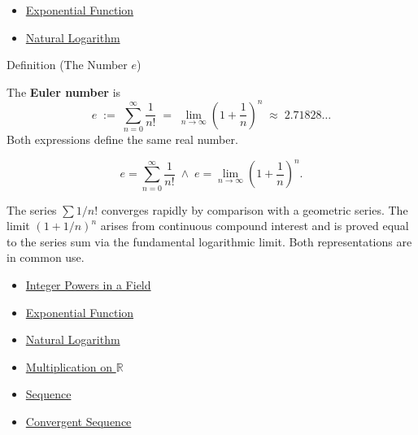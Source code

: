 \begin{dependencies}
\begin{itemize}
  \item \hyperref[def:exponential]{Exponential Function}
  \item \hyperref[def:natural-logarithm]{Natural Logarithm}
\end{itemize}
\end{dependencies}

\begin{definitionbox}{Definition (The Number $e$)}
\begin{definition}
\label{def:number-e}
The \textbf{Euler number} is
\[
  e \;:=\; \sum_{n=0}^{\infty} \frac{1}{n!}
  \;=\; \lim_{n \to \infty} \!\left(1 + \frac{1}{n}\right)^{\!n}
  \;\approx\; 2.71828\ldots
\]
Both expressions define the same real number.
\end{definition}
\end{definitionbox}

\begin{remark*}
\[
  e = \sum_{n=0}^\infty \frac{1}{n!}
  \;\wedge\;
  e = \lim_{n\to\infty}\!\left(1+\frac{1}{n}\right)^n.
\]
\end{remark*}

\begin{remark*}[Interpretation]
The series $\sum 1/n!$ converges rapidly by comparison with a
geometric series. The limit $(1+1/n)^n$ arises from continuous
compound interest and is proved equal to the series sum via the
fundamental logarithmic limit. Both representations are in common use.
\end{remark*}

\begin{dependencies}
\begin{itemize}
  \item \hyperref[def:two-sided-inverse]{Integer Powers in a Field}
  \item \hyperref[def:exponential]{Exponential Function}
  \item \hyperref[def:natural-logarithm]{Natural Logarithm}
  \item \hyperref[def:multiplication-on-r]{Multiplication on $\mathbb{R}$}
\end{itemize}


\begin{itemize}
  \item \hyperref[def:sequence]{Sequence}
  \item \hyperref[def:convergent-sequence]{Convergent Sequence}
\end{itemize}
\end{dependencies}

